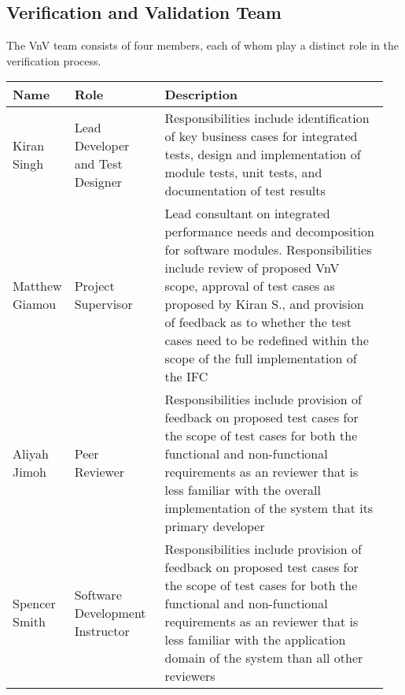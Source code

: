 \documentclass[12pt, titlepage]{article}
\begin{document}
\subsection{Verification and Validation Team}
The VnV team consists of four members, each of whom play a distinct role in the 
verification process.\\
\begin{tabular}{|p{0.11\linewidth}|p{0.24\linewidth}|p{0.6\linewidth}|} 
  \hline
  \textbf{Name} & \textbf{Role} & \textbf{Description}\\
  \hline
  Kiran Singh & Lead Developer and Test Designer & Responsibilities include 
  identification of key business cases for integrated tests,  design and 
  implementation of module tests, unit tests, and documentation of test 
  results\\
  \hline
  Matthew Giamou & Project Supervisor & Lead consultant on integrated 
  performance needs and decomposition for software modules. Responsibilities 
  include review of proposed VnV scope, approval of test cases as proposed by 
  Kiran S., and provision of feedback as to whether the test cases need to be 
  redefined within the scope of the full implementation of the IFC\\
  \hline
  Aliyah Jimoh & Peer Reviewer & Responsibilities include provision of 
  feedback on proposed test cases for the 
  scope of test cases for both the functional and non-functional requirements 
  as an reviewer that is less familiar with the overall implementation of the 
  system that its primary developer\\
  \hline
  Spencer Smith & Software Development Instructor & Responsibilities include 
  provision of feedback on proposed test cases for the scope of test cases 
  for both the functional and non-functional requirements as an reviewer that 
  is less familiar with the application domain of the system than all other 
  reviewers\\
  \bottomrule
\end{tabular}\\
\end{document}
